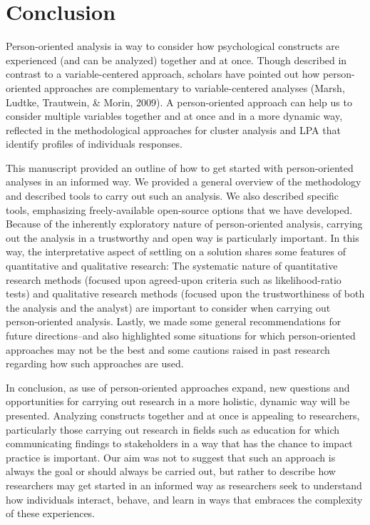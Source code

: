 \documentclass[man]{apa6}
\begin{document}
\hypertarget{conclusion}{%
\section{Conclusion}\label{conclusion}}

Person-oriented analysis ia way to consider how psychological constructs are
experienced (and can be analyzed) together and at once. Though described in
contrast to a variable-centered approach, scholars have pointed out how
person-oriented approaches are complementary to variable-centered analyses
(Marsh, Ludtke, Trautwein, \& Morin, 2009). A person-oriented approach can help
us to consider multiple variables together and at once and in a more dynamic
way, reflected in the methodological approaches for cluster analysis and LPA
that identify profiles of individuals responses.

This manuscript provided an outline of how to get started with person-oriented
analyses in an informed way. We provided a general overview of the methodology
and described tools to carry out such an analysis. We also described specific
tools, emphasizing freely-available open-source options that we have developed.
Because of the inherently exploratory nature of person-oriented analysis,
carrying out the analysis in a trustworthy and open way is particularly
important. In this way, the interpretative aspect of settling on a solution
shares some features of quantitative and qualitative research: The systematic
nature of quantitative research methods (focused upon agreed-upon criteria such
as likelihood-ratio tests) and qualitative research methods (focused upon the
trustworthiness of both the analysis and the analyst) are important to consider
when carrying out person-oriented analysis. Lastly, we made some general
recommendations for future directions--and also highlighted some situations for
which person-oriented approaches may not be the best and some cautions raised in
past research regarding how such approaches are used.

In conclusion, as use of person-oriented approaches expand, new questions and
opportunities for carrying out research in a more holistic, dynamic way will be
presented. Analyzing constructs together and at once is appealing to
researchers, particularly those carrying out research in fields such as
education for which communicating findings to stakeholders in a way that has the
chance to impact practice is important. Our aim was not to suggest that such an
approach is always the goal or should always be carried out, but rather to
describe how researchers may get started in an informed way as researchers seek
to understand how individuals interact, behave, and learn in ways that embraces
the complexity of these experiences.
\end{document}
